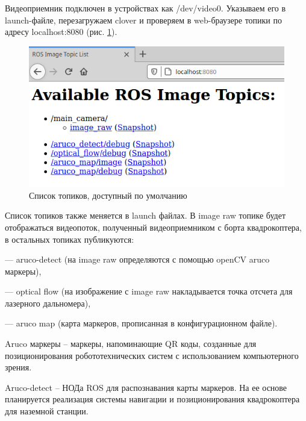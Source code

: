 Видеоприемник подключен в устройствах как /dev/video0. Указываем его в launch-файле, перезагружаем clover и проверяем в web-браузере топики по адресу localhost:8080 (рис. \ref{fig:topic}).

\begin{figure}[H]
	\centering
	\includegraphics[width=0.5\linewidth]{pics/topic}
	\caption{Список топиков, доступный по умолчанию
	}
	\label{fig:topic}
\end{figure}

Список топиков также меняется в launch файлах. В image raw топике будет отображаться видеопоток, полученный видеоприемником с борта квадрокоптера, в остальных топиках публикуются:

--- aruco-detect (на image raw определяются с помощью openCV aruco маркеры),

--- optical flow (на изображение с image raw накладывается точка отсчета для лазерного дальномера),

--- aruco map (карта маркеров, прописанная в конфигурационном файле).

Aruco маркеры -- маркеры, напоминающие QR коды, созданные для позиционирования робототехнических систем с использованием компьютерного зрения.

Aruco-detect -- НОДа ROS для распознавания карты маркеров. На ее основе планируется реализация системы навигации и позиционирования квадрокоптера для наземной станции. 

